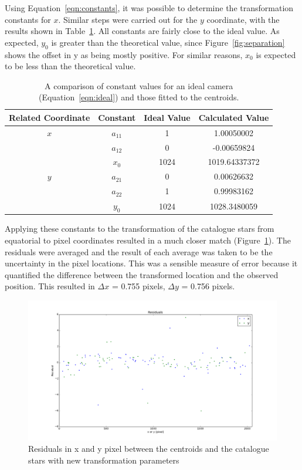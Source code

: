 \documentclass[a4paper,12pt]{article}
\begin{document}
Using Equation~\ref{eqn:constants}, it was possible to determine the transformation constants for $x$. Similar steps were carried out for the $y$ coordinate, with the results shown in Table~\ref{tab:constants}. All constants are fairly close to the ideal value. As expected, $y_{0}$ is greater than the theoretical value, since Figure~\ref{fig:separation} shows the offset in y as being mostly positive. For similar reasons, $x_{0}$ is expected to be less than the theoretical value.

\begin{center}
\begin{table}[!htbp]
  \centering
  \begin{tabular}{c||c||c||c}
  	Related Coordinate & Constant & Ideal Value & Calculated Value \\
  	\hline
  	\hline
  	$x$ & $a_{11}$ & 1 & 1.00050002 \\
  	& $a_{12}$ & 0 & -0.00659824 \\
  	& $x_{0}$ & 1024 & 1019.64337372 \\
    \hline
  	$y$ & $a_{21}$ & 0 & 0.00626632 \\
  	& $a_{22}$ & 1 & 0.99983162 \\
  	& $y_{0}$ & 1024 & 1028.3480059 \\
   \end{tabular}
    \caption{A comparison of constant values for an ideal camera (Equation~\ref{eqn:ideal}) and those fitted to the centroids.}
    \label{tab:constants}
\end{table}
\end{center}

Applying these constants to the transformation of the catalogue stars from equatorial to pixel coordinates resulted in a much closer match (Figure~\ref{fig:residuals}). The residuals were averaged and the result of each average was taken to be the uncertainty in the pixel locations. This was a sensible measure of error because it quantified the difference between the transformed location and the observed position. This resulted in $\Delta x$ = 0.755 pixels, $\Delta y$ = 0.756 pixels.

\begin{figure}[!htbp]
\centering
\includegraphics[scale = 0.35]{fit_residuals.png}
\caption{Residuals in x and y pixel between the centroids and the catalogue stars with new transformation parameters}
\label{fig:residuals}
\end{figure}
\end{document}
